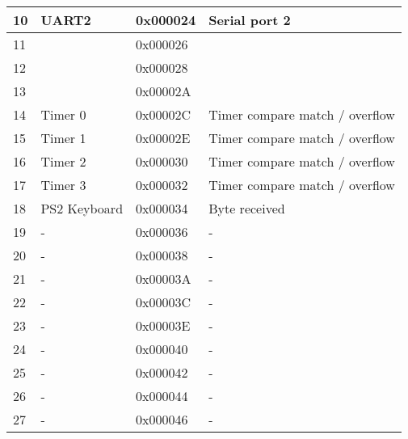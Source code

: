 \begin{table}[h]
\begin{tabular}{|l|l|l|l|}
        10                  & UART2               & 0x000024        & Serial port 2                  \\ \hline
        11                  &                     & 0x000026        &                                \\ \hline
        12                  &                     & 0x000028        &                                \\ \hline
        13                  &                     & 0x00002A        &                                \\ \hline
        14                  & Timer 0             & 0x00002C        & Timer compare match / overflow \\ \hline
        15                  & Timer 1             & 0x00002E        & Timer compare match / overflow \\ \hline
        16                  & Timer 2             & 0x000030        & Timer compare match / overflow \\ \hline
        17                  & Timer 3             & 0x000032        & Timer compare match / overflow \\ \hline
        18                  & PS2 Keyboard        & 0x000034        & Byte received                  \\ \hline
        19                  & -                   & 0x000036        & -                              \\ \hline
        20                  & -                   & 0x000038        & -                              \\ \hline
        21                  & -                   & 0x00003A        & -                              \\ \hline
        22                  & -                   & 0x00003C        & -                              \\ \hline
        23                  & -                   & 0x00003E        & -                              \\ \hline
        24                  & -                   & 0x000040        & -                              \\ \hline
        25                  & -                   & 0x000042        & -                              \\ \hline
        26                  & -                   & 0x000044        & -                              \\ \hline
        27                  & -                   & 0x000046        & -                              \\ \hline

\end{tabular}
\end{table}
